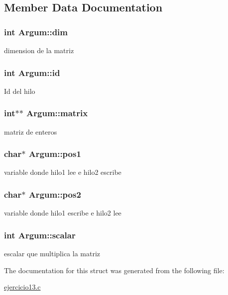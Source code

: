 \subsection{Member Data Documentation}
\hypertarget{structArgum_a69c560b91efcd6709b891e9a7fd204bd}{
\subsubsection[{dim}]{\setlength{\rightskip}{0pt plus 5cm}int Argum\+::dim}}\label{structArgum_a69c560b91efcd6709b891e9a7fd204bd}
dimension de la matriz \hypertarget{structArgum_a1e19639236d672db337655913280c502}{
\subsubsection[{id}]{\setlength{\rightskip}{0pt plus 5cm}int Argum\+::id}}\label{structArgum_a1e19639236d672db337655913280c502}
Id del hilo \hypertarget{structArgum_a5e62bf7d3af611b48cdeed5decdf47be}{
\subsubsection[{matrix}]{\setlength{\rightskip}{0pt plus 5cm}int$\ast$$\ast$ Argum\+::matrix}}\label{structArgum_a5e62bf7d3af611b48cdeed5decdf47be}
matriz de enteros \hypertarget{structArgum_a6ba39122df5e87923c854fdb415b37af}{
\subsubsection[{pos1}]{\setlength{\rightskip}{0pt plus 5cm}char$\ast$ Argum\+::pos1}}\label{structArgum_a6ba39122df5e87923c854fdb415b37af}
variable donde hilo1 lee e hilo2 escribe \hypertarget{structArgum_a69aaf9b57d62f8704a7f83afaca5d361}{
\subsubsection[{pos2}]{\setlength{\rightskip}{0pt plus 5cm}char$\ast$ Argum\+::pos2}}\label{structArgum_a69aaf9b57d62f8704a7f83afaca5d361}
variable donde hilo1 escribe e hilo2 lee \hypertarget{structArgum_a8f60de19f057d334f365ec7ef21d7439}{
\subsubsection[{scalar}]{\setlength{\rightskip}{0pt plus 5cm}int Argum\+::scalar}}\label{structArgum_a8f60de19f057d334f365ec7ef21d7439}
escalar que multiplica la matriz 

The documentation for this struct was generated from the following file\+:\begin{DoxyCompactItemize}
\item 
\hyperlink{ejercicio13_8c}{ejercicio13.\+c}\end{DoxyCompactItemize}

